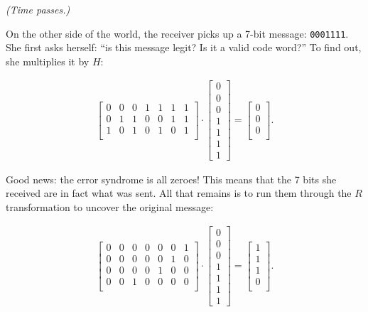 \textit{(Time passes.)}


On the other side of the world, the receiver picks up a 7-bit message:
\texttt{0001111}. She first asks herself: ``is this message legit? Is it a
valid code word?'' To find out, she multiplies it by $H$:

\vspace{-.15in}
\begin{align*}
\begin{bmatrix}
0 & 0 & 0 & 1 & 1 & 1 & 1 \\
0 & 1 & 1 & 0 & 0 & 1 & 1 \\
1 & 0 & 1 & 0 & 1 & 0 & 1 \\
\end{bmatrix} \cdot
\begin{bmatrix}
0 \\ 0 \\ 0 \\ 1 \\ 1 \\ 1 \\ 1
\end{bmatrix} =
\begin{bmatrix}
0 \\ 0 \\ 0 \\
\end{bmatrix}.
\end{align*}
\vspace{-.15in}

Good news: the error syndrome is all zeroes! This means that the 7 bits she
received are in fact what was sent. All that remains is to run them through the
$R$ transformation to uncover the original message:

\vspace{-.15in}
\begin{align*}
\begin{bmatrix}
0 & 0 & 0 & 0 & 0 & 0 & 1 \\
0 & 0 & 0 & 0 & 0 & 1 & 0 \\
0 & 0 & 0 & 0 & 1 & 0 & 0 \\
0 & 0 & 1 & 0 & 0 & 0 & 0 \\
\end{bmatrix} \cdot
\begin{bmatrix}
0 \\ 0 \\ 0 \\ 1 \\ 1 \\ 1 \\ 1
\end{bmatrix} =
\begin{bmatrix}
1 \\ 1 \\ 1 \\ 0 \\
\end{bmatrix}.
\end{align*}
\vspace{-.15in}

